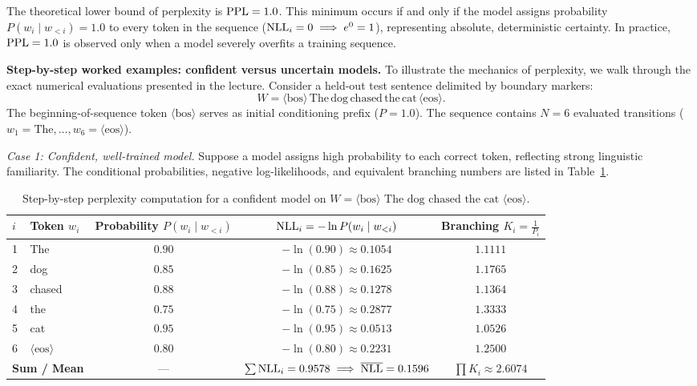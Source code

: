 \documentclass[../../main.tex]{subfiles}
\begin{document}
The theoretical lower bound of perplexity is $\mathrm{PPL} = 1.0$. This minimum occurs if and only if the model assigns probability $P(w_i \mid w_{<i}) = 1.0$ to every token in the sequence ($\mathrm{NLL}_i = 0 \implies e^0 = 1$), representing absolute, deterministic certainty. In practice, $\mathrm{PPL} = 1.0$ is observed only when a model severely overfits a training sequence.

\noindent\textbf{Step-by-step worked examples: confident versus uncertain models.}\newline
To illustrate the mechanics of perplexity, we walk through the exact numerical evaluations presented in the lecture. Consider a held-out test sentence delimited by boundary markers:
\begin{equation*}
W = \langle\text{bos}\rangle \, \text{The} \, \text{dog} \, \text{chased} \, \text{the} \, \text{cat} \, \langle\text{eos}\rangle.
\end{equation*}
The beginning-of-sequence token $\langle\text{bos}\rangle$ serves as initial conditioning prefix ($P=1.0$). The sequence contains $N = 6$ evaluated transitions ($w_1 = \text{The}, \dots, w_6 = \langle\text{eos}\rangle$).

\textit{Case 1: Confident, well-trained model.}
Suppose a model assigns high probability to each correct token, reflecting strong linguistic familiarity. The conditional probabilities, negative log-likelihoods, and equivalent branching numbers are listed in Table~\ref{tab:perplexity_confident_example}.

\begin{table}[htbp]
\centering
\small
\caption{Step-by-step perplexity computation for a confident model on $W = \langle\text{bos}\rangle \text{ The dog chased the cat } \langle\text{eos}\rangle$.}
\label{tab:perplexity_confident_example}
\begin{tabular}{llccc}
\toprule
$i$ & Token $w_i$ & Probability $P(w_i \mid w_{<i})$ & $\mathrm{NLL}_i = -\ln P(w_i \mid w_{<i})$ & Branching $K_i = \frac{1}{P_i}$ \\
\midrule
1 & The & $0.90$ & $-\ln(0.90) \approx 0.1054$ & $1.1111$ \\
2 & dog & $0.85$ & $-\ln(0.85) \approx 0.1625$ & $1.1765$ \\
3 & chased & $0.88$ & $-\ln(0.88) \approx 0.1278$ & $1.1364$ \\
4 & the & $0.75$ & $-\ln(0.75) \approx 0.2877$ & $1.3333$ \\
5 & cat & $0.95$ & $-\ln(0.95) \approx 0.0513$ & $1.0526$ \\
6 & $\langle\text{eos}\rangle$ & $0.80$ & $-\ln(0.80) \approx 0.2231$ & $1.2500$ \\
\midrule
\multicolumn{2}{l}{\textbf{Sum / Mean}} & --- & $\sum \mathrm{NLL}_i = 0.9578 \implies \overline{\mathrm{NLL}} = 0.1596$ & $\prod K_i \approx 2.6074$ \\
\bottomrule
\end{tabular}
\end{table}
\end{document}
